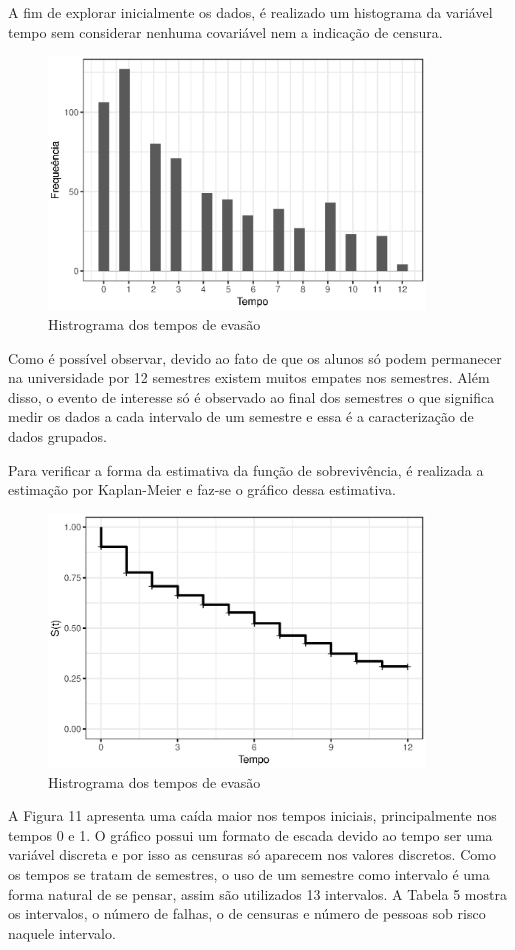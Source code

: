 \documentclass[a4paper,12pt]{article}
\begin{document}
A fim de explorar inicialmente os dados, é realizado um histograma da variável tempo sem considerar nenhuma covariável nem a indicação de censura.

\begin{figure}[H]
  \centering
  \includegraphics[width=10cm]{quim_hist}
  \caption{Histrograma dos tempos de evasão}
\end{figure}

Como é possível observar, devido ao fato de que os alunos só podem permanecer na universidade por 12 semestres existem muitos empates nos semestres. Além disso, o evento de interesse só é observado ao final dos semestres o que significa medir os dados a cada intervalo de um semestre e essa é a caracterização de dados grupados.

Para verificar a forma da estimativa da função de sobrevivência, é realizada a estimação por Kaplan-Meier e faz-se o gráfico dessa estimativa.

\begin{figure}[H]
  \centering
  \includegraphics[width=10cm]{surv_quim.eps}
  \caption{Histrograma dos tempos de evasão}
\end{figure}

A Figura 11 apresenta uma caída maior nos tempos iniciais, principalmente nos tempos 0 e 1. O gráfico possui um formato de escada devido ao tempo ser uma variável discreta e por isso as censuras só aparecem nos valores discretos. Como os tempos se tratam de semestres, o uso de um semestre como intervalo é uma forma natural de se pensar, assim são utilizados 13 intervalos. A Tabela 5 mostra os intervalos, o número de falhas, o de censuras e número de pessoas sob risco naquele intervalo.
\end{document}
